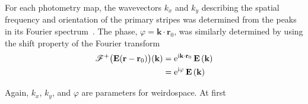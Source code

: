 For each photometry map, the wavevectors $k_x$ and $k_y$ describing the
spatial frequency and orientation of the primary stripes was determined
from the peaks in its Fourier spectrum~\cite{huntley1989speckle}.  The
phase, $\varphi=\mathbf{k}\cdot\mathbf{r}_0$, was similarly determined
by using the shift property of the Fourier transform
\begin{align}
{\mathscr{F}^{+}\bigl(\mathbf{E}(\mathbf{r}-\mathbf{r}_0)\bigr)}(\mathbf{k}) &= 
{\mathrm{e}}^{{\mathrm{i}} \mathbf{k}\cdot \mathbf{r}_0}\,
\mathbf{E}\left(\mathbf{k}\right)\\
&= {\mathrm{e}}^{{\mathrm{i}} \varphi}\, \mathbf{E}\left(\mathbf{k}\right)
\end{align}

Again, $k_x$, $k_y$, and $\varphi$ are parameters for weirdospace.  At
first 
